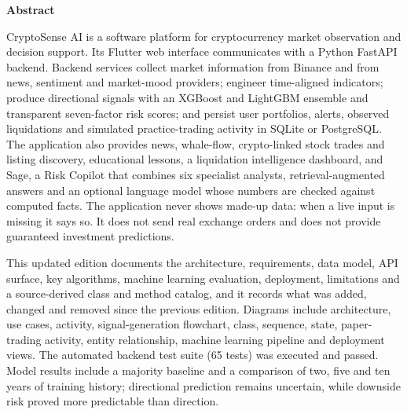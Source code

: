 \begin{center}{\Large\bfseries Abstract}\end{center}
\vspace{0.2cm}
{
CryptoSense AI is a software platform for cryptocurrency market observation and decision support. Its Flutter web interface communicates with a Python FastAPI backend. Backend services collect market information from Binance and from news, sentiment and market-mood providers; engineer time-aligned indicators; produce directional signals with an XGBoost and LightGBM ensemble and transparent seven-factor risk scores; and persist user portfolios, alerts, observed liquidations and simulated practice-trading activity in SQLite or PostgreSQL. The application also provides news, whale-flow, crypto-linked stock trades and listing discovery, educational lessons, a liquidation intelligence dashboard, and Sage, a Risk Copilot that combines six specialist analysts, retrieval-augmented answers and an optional language model whose numbers are checked against computed facts. The application never shows made-up data: when a live input is missing it says so. It does not send real exchange orders and does not provide guaranteed investment predictions.

This updated edition documents the architecture, requirements, data model, API surface, key algorithms, machine learning evaluation, deployment, limitations and a source-derived class and method catalog, and it records what was added, changed and removed since the previous edition. Diagrams include architecture, use cases, activity, signal-generation flowchart, class, sequence, state, paper-trading activity, entity relationship, machine learning pipeline and deployment views. The automated backend test suite (65 tests) was executed and passed. Model results include a majority baseline and a comparison of two, five and ten years of training history; directional prediction remains uncertain, while downside risk proved more predictable than direction.\par}
\clearpage
